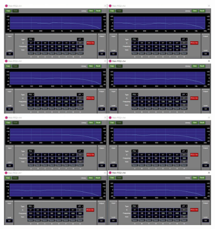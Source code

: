 \documentclass[11pt,a4j]{jreport}
\begin{document}
\begin{figure}[H]
  \begin{minipage}[b]{.5\linewidth}
    \centering
    \includegraphics[width=.9\linewidth]{images/experimentField/afcParameters/03gamma/04manualEQ1.jpg}
  \end{minipage}%
  \begin{minipage}[b]{.5\linewidth}
    \centering
    \includegraphics[width=.9\linewidth]{images/experimentField/afcParameters/03gamma/04manualEQ2.jpg}
  \end{minipage}


\end{figure}
\end{document}
